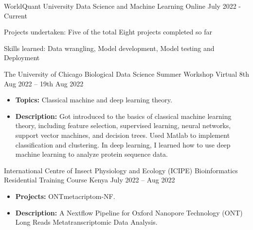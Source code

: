 \newpage
{}


\begin{cventries}
 
   \cventry
    {WorldQuant University} %
    {Data Science and Machine Learning } %
    {Online} %
    { July 2022 - Current} %
    {
      \begin{cvitems} %
        \item {Projects undertaken: Five of the total Eight projects completed so far}
        \item {Skills learned: Data wrangling, Model development, Model testing and Deployment}
      \end{cvitems}
    }

    
    \cventry
    {The University of Chicago} %
    {Biological Data Science Summer Workshop} %
    {Virtual} %
    {8th Aug 2022 -- 19th Aug 2022} %
    {
      \begin{itemize} %
        \item \textbf{Topics:} Classical machine and deep learning theory.
        \item \textbf{Description:} Got introduced to the basics of classical machine learning theory, including feature selection, supervised learning, neural networks, support vector machines, and decision trees. Used Matlab to implement classification and clustering. In deep learning, I learned how to use deep machine learning to analyze protein sequence data.
      \end{itemize}
    }
    
    \cventry
    {International Centre of Insect Physiology and Ecology (ICIPE)} %
    {Bioinformatics Residential Training Course} %
    {Kenya} %
    {July 2022 -- Aug 2022} %
    {
      \begin{itemize} %
        \item \textbf{Projects:} ONTmetacriptom-NF.
        \item \textbf{Description:} A Nextflow Pipeline for Oxford Nanopore Technology (ONT) Long Reads Metatranscriptomic Data Analysis.
      \end{itemize}
    }
    

\end{cventries}

